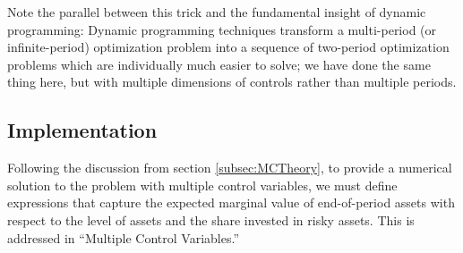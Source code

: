 \documentclass[titlepage, headings=optiontotocandhead]{Resources/texmf-local/tex/latex/econtex}
\begin{document}
Note the parallel between this trick and the fundamental insight of dynamic programming: Dynamic programming techniques transform a multi-period (or infinite-period) optimization problem into a sequence of two-period optimization problems which are individually much easier to solve; we have done the same thing here, but with multiple dimensions of controls rather than multiple periods.

\hypertarget{implementation}{}
\subsection{Implementation}

Following the discussion from section \ref{subsec:MCTheory}, to provide a numerical solution to the problem
with multiple control variables, we must define expressions that capture the expected marginal value of end-of-period
assets with respect to the level of assets and the share invested in risky assets. This is addressed in ``Multiple Control Variables.''




\end{document}
